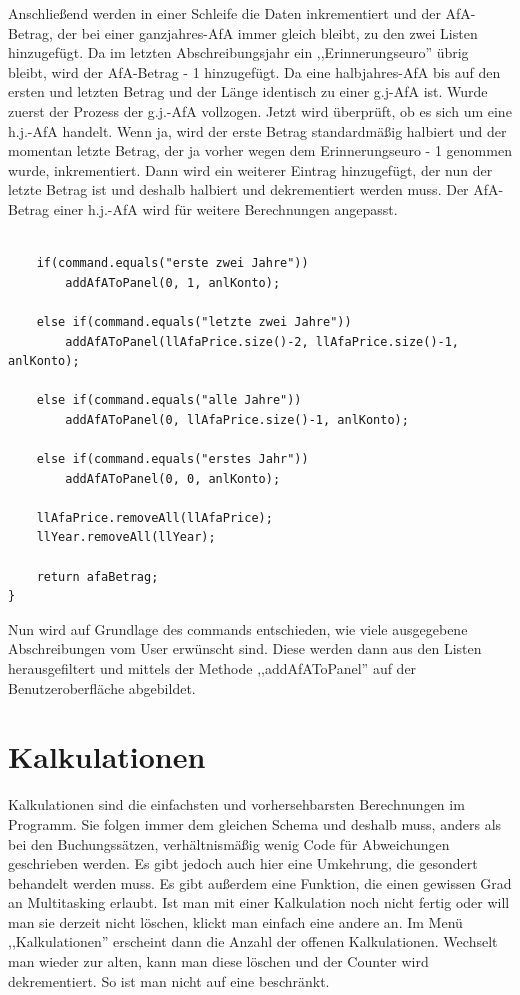 \documentclass[12pt]{report}
\begin{document}
\noindent Anschließend werden in einer Schleife die Daten inkrementiert und der AfA-Betrag, der bei einer ganzjahres-AfA immer gleich bleibt, zu den zwei Listen hinzugefügt.  Da im letzten Abschreibungsjahr ein ,,Erinnerungseuro'' übrig bleibt, wird der AfA-Betrag - 1 hinzugefügt. Da eine halbjahres-AfA bis auf den ersten und letzten Betrag und der Länge identisch zu einer g.j-AfA ist. Wurde zuerst der Prozess der g.j.-AfA vollzogen. Jetzt wird überprüft, ob es sich um eine h.j.-AfA handelt. Wenn ja, wird der erste Betrag standardmäßig halbiert und der momentan letzte Betrag, der ja vorher wegen dem Erinnerungseuro - 1 genommen wurde, inkrementiert. Dann wird ein weiterer Eintrag hinzugefügt, der nun der letzte Betrag ist und deshalb halbiert und dekrementiert werden muss. Der AfA-Betrag einer h.j.-AfA wird für weitere Berechnungen angepasst.
	
\begin{lstlisting}
		
	if(command.equals("erste zwei Jahre"))
	    addAfAToPanel(0, 1, anlKonto);
	
	else if(command.equals("letzte zwei Jahre"))
	    addAfAToPanel(llAfaPrice.size()-2, llAfaPrice.size()-1, anlKonto);
	
	else if(command.equals("alle Jahre"))
	    addAfAToPanel(0, llAfaPrice.size()-1, anlKonto);
	
	else if(command.equals("erstes Jahr"))
	    addAfAToPanel(0, 0, anlKonto);
	
	llAfaPrice.removeAll(llAfaPrice);
	llYear.removeAll(llYear);
	
	return afaBetrag;
}
\end{lstlisting}

\noindent Nun wird auf Grundlage des commands entschieden, wie viele ausgegebene Abschreibungen vom User erwünscht sind. Diese werden dann aus den Listen herausgefiltert und mittels der Methode ,,addAfAToPanel'' auf der Benutzeroberfläche abgebildet.
  
\section{Kalkulationen}
Kalkulationen sind die einfachsten und vorhersehbarsten Berechnungen im Programm. Sie folgen immer dem gleichen Schema und deshalb muss, anders als bei den Buchungssätzen, verhältnismäßig wenig Code für Abweichungen geschrieben werden. Es gibt jedoch auch hier eine Umkehrung, die gesondert behandelt werden muss. Es gibt außerdem eine Funktion, die einen gewissen Grad an Multitasking erlaubt. Ist man mit einer Kalkulation noch nicht fertig oder will man sie derzeit nicht löschen, klickt man einfach eine andere an. Im Menü ,,Kalkulationen'' erscheint dann die Anzahl der offenen Kalkulationen. Wechselt man wieder zur alten, kann man diese löschen und der Counter wird dekrementiert. So ist man nicht auf eine beschränkt.
\end{document}
